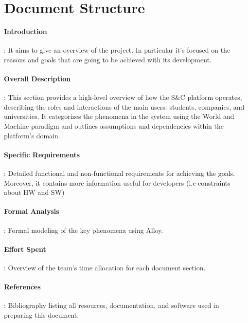 \section{Document Structure}
\label{sec:document_structure}%

\paragraph{Introduction}: It aims to give an overview of the project. In
  particular it's focused on the reasons and goals that are going to be
  achieved with its development.
\paragraph{Overall Description}: This section provides a high-level
  overview of how the S\&C platform operates, describing the roles and
  interactions of the main users: students, companies, and universities.
  It categorizes the phenomena in the system using the World and Machine
  paradigm and outlines assumptions and dependencies within the
  platform's domain.
\paragraph{Specific Requirements}: Detailed functional and non-functional
  requirements for achieving the goals. Moreover, it contains more
  information useful for developers (i.e constraints about HW and SW)
\paragraph{Formal Analysis}: Formal modeling of the key phenomena using
  Alloy.
\paragraph{Effort Spent}: Overview of the team's time allocation for each
  document section.
\paragraph{References}: Bibliography listing all resources,
  documentation, and software used in preparing this document.